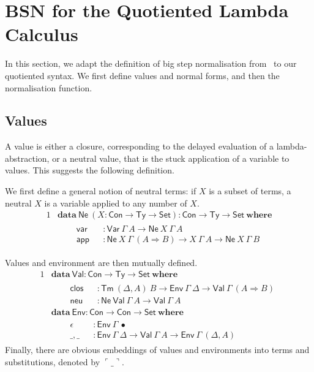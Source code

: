 \documentclass[a4paper,english,cleveref,autoref,draft]{lipics-v2019}
\newcommand{\agdaSymb}[1]{\mathsf{#1}}
\newcommand{\agdaKW}[1]{\mathbf{#1}}
\newcommand{\ind}{\hspace{1em}}
\newcommand{\data}{\agdaKW{data}}
\newcommand{\where}{\agdaKW{where}}
\newcommand{\Set}{\agdaSymb{Set}}
\newcommand{\Ty}{\agdaSymb{Ty}}
\newcommand{\Con}{\agdaSymb{Con}}
\newcommand{\Tm}{\agdaSymb{Tm}}
\newcommand{\app}{\agdaSymb{app}}
\newcommand{\Var}{\agdaSymb{Var}}
\newcommand{\Ne}{\agdaSymb{Ne}}
\newcommand{\Val}{\agdaSymb{Val}}
\newcommand{\Env}{\agdaSymb{Env}}
\newcommand{\NV}{\Ne\ \Val}
\newcommand{\var}{\agdaSymb{var}}
\newcommand{\neu}{\agdaSymb{neu}}
\newcommand{\clos}{\agdaSymb{clos}}
\newcommand{\cul}{\ulcorner}
\newcommand{\cur}{\urcorner}
\newcommand{\Ra}{\Rightarrow}
\begin{document}
\section{BSN for the Quotiented Lambda Calculus}
In this section, we adapt the definition of big step normalisation
from~\cite{chapman2009bsn} to our quotiented syntax.
We first define values and normal forms, and then the normalisation function.

\subsection{Values}
A value is either a closure, corresponding to the delayed evaluation of a
lambda-abstraction, or a neutral value, that is the stuck application of a
variable to values. This suggests the following definition.

We first define a general notion of neutral terms: if $X$ is a subset of terms,
a neutral $X$ is a variable applied to any number of $X$.
\begin{alignat*}{1}
  & \data\ \Ne\ (X : \Con \to \Ty \to \Set) : \Con \to \Ty \to \Set\ \where \\ & \ind
  \begin{alignedat}{2}
    & \var && : \Var\ \Gamma\ A \to \Ne\ X\ \Gamma\ A \\
    & \app && : \Ne\ X\ \Gamma\ (A \Ra B) \to X\ \Gamma\ A \to \Ne\ X\ \Gamma\ B
  \end{alignedat}
\end{alignat*}

Values and environment are then mutually defined.
\begin{alignat*}{1}
  & \data\ \Val : \Con \to \Ty \to \Set\ \where \\ & \ind
  \begin{alignedat}{2}
    & \clos  && : \Tm\ (\Delta,A)\ B \to \Env\ \Gamma\ \Delta \to \Val\ \Gamma\ (A \Ra B) \\
    & \neu   && : \NV\ \Gamma\ A \to \Val\ \Gamma\ A
  \end{alignedat} \\
  & \data\ \Env : \Con \to \Con \to \Set\ \where \\ & \ind
  \begin{alignedat}{2}
    & \epsilon && : \Env\ \Gamma\ \bullet \\
    & \_,\_ && : \Env\ \Gamma\ \Delta \to \Val\ \Gamma\ A \to \Env\ \Gamma\ (\Delta,A)
  \end{alignedat}
\end{alignat*}
Finally, there are obvious embeddings of values and environments into terms and
substitutions, denoted by $\cul\_\cur$.
\end{document}
